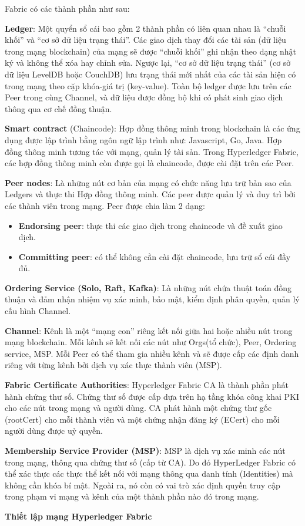 Fabric có các thành phần như sau:

\textbf{Ledger}: Một quyển sổ cái bao gồm 2 thành phần có liên quan nhau là “chuỗi khối” và “cơ sở dữ liệu trạng thái”. Các giao dịch thay đổi các tài sản (dữ liệu trong mạng blockchain) của mạng sẽ được “chuỗi khối” ghi nhận theo dạng nhật ký và không thể xóa hay chỉnh sửa. Ngược lại, “cơ sở dữ liệu trạng thái” (cơ sở dữ liệu LevelDB hoặc CouchDB) lưu trạng thái mới nhất của các tài sản hiện có trong mạng theo cặp khóa-giá trị (key-value). Toàn bộ ledger được lưu trên các Peer trong cùng Channel, và dữ liệu được đồng bộ khi có phát sinh giao dịch thông qua cơ chế đồng thuận.


\textbf{Smart contract} (Chaincode): Hợp đồng thông minh trong blockchain là các ứng dụng được lập trình bằng ngôn ngữ lập trình như: Javascript, Go, Java. Hợp đồng thông minh tương tác với mạng, quản lý tài sản. Trong Hyperledger Fabric, các hợp đồng thông minh còn được gọi là chaincode, được cài đặt trên các Peer.

\textbf{Peer nodes}: Là những nút cơ bản của mạng có chức năng lưu trữ bản sao của Ledgers và thực thi Hợp đồng thông minh. Các peer được quản lý và duy trì bởi các thành viên trong mạng. Peer được chia làm 2 dạng:

\begin{itemize}
\item \textbf{Endorsing peer}: thực thi các giao dịch trong chaincode và đề xuất giao dịch.
\item \textbf{Committing peer}: có thể không cần cài đặt chaincode, lưu trữ sổ cái đầy đủ.
\end{itemize}

\textbf{Ordering Service (Solo, Raft, Kafka)}: Là những nút chứa thuật toán đồng thuận và đảm nhận nhiệm vụ xác minh, bảo mật, kiểm định phân quyền, quản lý cấu hình Channel.

\textbf{Channel}: Kênh là một “mạng con” riêng kết nối giữa hai hoặc nhiều nút trong mạng blockchain. Mỗi kênh sẽ kết nối các nút như Orgs(tổ chức), Peer, Ordering service, MSP. Mỗi Peer có thể tham gia nhiều kênh và sẽ được cấp các định danh riêng với từng kênh bởi dịch vụ xác thực thành viên (MSP).

\textbf{Fabric Certificate Authorities}: Hyperledger Fabric CA là thành phần phát hành chứng thư số. Chứng thư số được cấp dựa trên hạ tầng khóa công khai PKI cho các nút trong mạng và người dùng. CA phát hành một chứng thư gốc (rootCert) cho mỗi thành viên và một chứng nhận đăng ký (ECert) cho mỗi người dùng được uỷ quyền.

\textbf{Membership Service Provider (MSP)}: MSP là dịch vụ xác minh các nút trong mạng, thông qua chứng thư số (cấp từ CA). Do đó HyperLedger Fabric có thể xác thực các thực thể kết nối với mạng thông qua danh tính (Identities) mà không cần khóa bí mật. Ngoài ra, nó còn có vai trò xác định quyền truy cập trong phạm vi mạng và kênh của một thành phần nào đó trong mạng.

\textbf{Thiết lập mạng Hyperledger Fabric}


